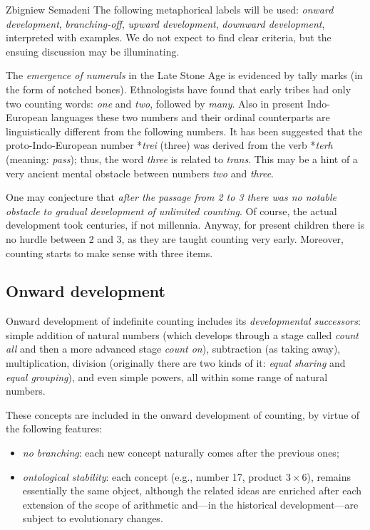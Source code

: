\begin{artengenv}{Zbigniew Semadeni}
\noindent The following metaphorical labels will be used: \textit{onward development}, 
\textit{branching-off},    %
\textit{upward development}, \textit{downward development}, interpreted with 
examples. We do not expect to find clear criteria, but the ensuing discussion 
may be illuminating. 

The \textit{emergence of numerals} in the Late Stone Age is evidenced by tally 
marks (in the form of notched bones). Ethnologists have found that early tribes 
had only two counting words: \textit{one} and \textit{two}, followed by \textit{many}. 
Also in present Indo-European languages these two numbers and their ordinal 
counterparts are linguistically different from the following numbers. 
It has been suggested that the proto-Indo-European number *\textit{trei} (three) was 
derived from the verb *\textit{terh} (meaning: \textit{pass}); thus, the word 
\textit{three} is related to \textit{trans}. This may be a hint of a very ancient 
mental obstacle between numbers \textit{two} and \textit{three}. 

One may conjecture that \textit{after the passage from 2 to 3 there was no notable 
obstacle to gradual development of unlimited counting}. Of course, the actual 
development took centuries, if not millennia. Anyway, for present children 
there is no hurdle between 2 and 3, as they are taught counting very early. 
Moreover, counting starts to make sense with three items. 

\subsection{Onward development}
Onward development of indefinite counting includes its \textit{developmental 
successors}: simple addition of natural numbers (which develops through a stage 
called \textit{count all} and then a more advanced stage \textit{count on}), 
subtraction (as taking away), multiplication, division (originally there are two 
kinds of it: \textit{equal sharing} and \textit{equal grouping}), and even simple 
powers, all within some range of natural numbers.  

These concepts are included in the onward development of counting, by virtue of 
the following features: 

\begin{itemize}
\item \textit{no branching}: each new concept naturally comes after the previous ones; 
\item \textit{ontological stability}: each concept (e.g., number 17, product 
\mbox{$3\times 6$}), remains essentially the same object, although the related 
ideas are enriched after each extension of the scope of arithmetic and---in the 
historical development---are subject to evolutionary changes.
\end{itemize}


\end{artengenv}
